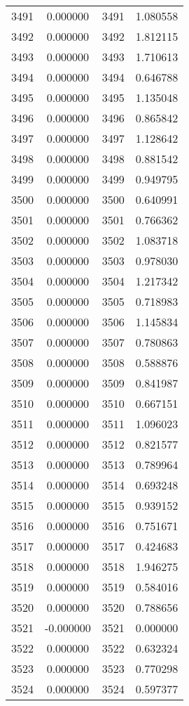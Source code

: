\documentclass[12pt]{article}
\begin{document}
\begin{longtable}{@{}cccc@{}}
3491 & 0.000000 & 3491 & 1.080558 \\
3492 & 0.000000 & 3492 & 1.812115 \\
3493 & 0.000000 & 3493 & 1.710613 \\
3494 & 0.000000 & 3494 & 0.646788 \\
3495 & 0.000000 & 3495 & 1.135048 \\
3496 & 0.000000 & 3496 & 0.865842 \\
3497 & 0.000000 & 3497 & 1.128642 \\
3498 & 0.000000 & 3498 & 0.881542 \\
3499 & 0.000000 & 3499 & 0.949795 \\
3500 & 0.000000 & 3500 & 0.640991 \\
3501 & 0.000000 & 3501 & 0.766362 \\
3502 & 0.000000 & 3502 & 1.083718 \\
3503 & 0.000000 & 3503 & 0.978030 \\
3504 & 0.000000 & 3504 & 1.217342 \\
3505 & 0.000000 & 3505 & 0.718983 \\
3506 & 0.000000 & 3506 & 1.145834 \\
3507 & 0.000000 & 3507 & 0.780863 \\
3508 & 0.000000 & 3508 & 0.588876 \\
3509 & 0.000000 & 3509 & 0.841987 \\
3510 & 0.000000 & 3510 & 0.667151 \\
3511 & 0.000000 & 3511 & 1.096023 \\
3512 & 0.000000 & 3512 & 0.821577 \\
3513 & 0.000000 & 3513 & 0.789964 \\
3514 & 0.000000 & 3514 & 0.693248 \\
3515 & 0.000000 & 3515 & 0.939152 \\
3516 & 0.000000 & 3516 & 0.751671 \\
3517 & 0.000000 & 3517 & 0.424683 \\
3518 & 0.000000 & 3518 & 1.946275 \\
3519 & 0.000000 & 3519 & 0.584016 \\
3520 & 0.000000 & 3520 & 0.788656 \\
3521 & -0.000000 & 3521 & 0.000000 \\
3522 & 0.000000 & 3522 & 0.632324 \\
3523 & 0.000000 & 3523 & 0.770298 \\
3524 & 0.000000 & 3524 & 0.597377 \\

\end{longtable}
\end{document}

